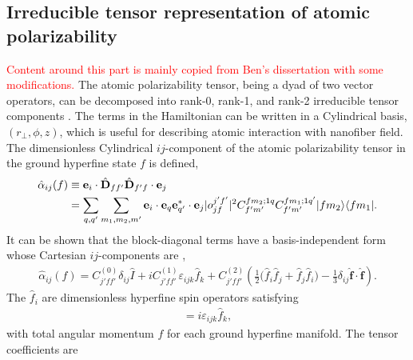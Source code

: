 \subsection{Irreducible tensor representation of atomic polarizability}
\textcolor{red}{Content around this part is mainly copied from Ben's dissertation with some modifications.}
The atomic polarizability tensor, being a dyad of two vector operators, can be decomposed into rank-0, rank-1, and rank-2 irreducible tensor components \cite{Stockton2007, Hammerer2006, Geremia2006, Deutsch2010a, LeKien2013}.  The terms in the Hamiltonian can be written in a Cylindrical basis, $ (r\!_\perp,\phi,z) $, which is useful for describing atomic interaction with nanofiber field. The dimensionless Cylindrical $ij$-component of the atomic polarizability tensor in the ground hyperfine state $f$ is defined,
\begin{align} \label{Eq::alphaij}
\hat{\alpha}_{ij}(f) &\equiv \mathbf{e}_i \cdot \hat{\mathbf{D}}_{f f'} \hat{\mathbf{D}}_{f' f} \cdot \mathbf{e}_j\\
&= \sum_{q,q'} \sum_{m_1, m_2, m'} \mathbf{e}_i \cdot\mathbf{e}_q \mathbf{e}^*_{q'}\cdot \mathbf{e}_j | o^{j'f'}_{jf} |^2 C^{fm_2;1q}_{f'm'} C^{fm_1;1q'}_{f'm'} \op{f m_2}{f m_1}.
\end{align}	
It can be shown that the block-diagonal terms have a basis-independent form whose Cartesian $ij$-components are \cite{Deutsch2010a},
	\begin{align} \label{Eq::IrreducibleDecomp}
		\hat{\alpha}_{ij} (f) = C_{j' f f'}^{(0)} \delta_{ij} \hat{ I } + i C_{j' f f'}^{(1)} \varepsilon_{ijk} \hat{f}_k + C_{j' f f'}^{(2)} \left(\frac{1}{2} \big(\hat{f}_i \hat{f}_j + \hat{f}_j \hat{f}_i \big) - \frac{1}{3} \delta_{ij} \hat{ \mathbf{f} } \cdot \hat{ \mathbf{f} }  \right).  
	\end{align}
The $\hat{f}_i$ are dimensionless hyperfine spin operators satisfying
	\begin{align}
		[\hat{f}_i, \hat{f}_j] = i \varepsilon_{ijk} \hat{f}_k,
	\end{align}
with total angular momentum $f$ for each ground hyperfine manifold.  The tensor coefficients are~\cite{Deutsch2010a}
